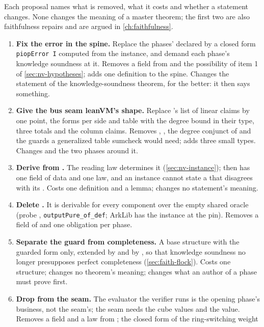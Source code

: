 Each proposal names what is removed, what it costs and whether a statement changes. None
changes the meaning of a master theorem; the first two are also faithfulness repairs and are
argued in \cref{ch:faithfulness}.

\begin{enumerate}
\item \textbf{Fix the error in the spine.} Replace the phases' declared  by a closed
  form \texttt{piopError I} computed from the instance, and demand each phase's knowledge
  soundness at it. Removes a field from  and the possibility of item 1 of
  \cref{sec:nv-hypotheses}; adds one definition to the spine. Changes the statement of the
  knowledge-soundness theorem, for the better: it then says something.
\item \textbf{Give the bus seam leanVM's shape.} Replace 's list of linear claims
  by one point, the forms per side and table with the degree bound in their type, three totals
  and the column claims. Removes , , the degree conjunct of
   and the guards a generalized table sumcheck would need; adds three small
  types. Changes  and the two phases around it.
\item \textbf{Derive  from .} The reading law determines it
  (\cref{sec:nv-instance});  then has one field of data and one law, and an
  instance cannot state a  that disagrees with its . Costs one
  definition and a lemma; changes no statement's meaning.
\item \textbf{Delete .} It is derivable for every component over the empty
  shared oracle (probe , \texttt{outputPure\_of\_def}; ArkLib has the instance at
  the pin). Removes a field of  and one obligation per phase.
\item \textbf{Separate the guard from completeness.} A base structure with the guarded form
  only, extended by  and by , so that knowledge soundness no
  longer presupposes perfect completeness (\cref{sec:faith-flock}). Costs one structure;
  changes no theorem's meaning; changes what an author of a phase must prove first.
\item \textbf{Drop  from the seam.} The evaluator the verifier runs is the
  opening phase's business, not the seam's; the seam needs the cube values and the value.
  Removes a field and a law from ; the closed form of the ring-switching weight

\end{enumerate}
